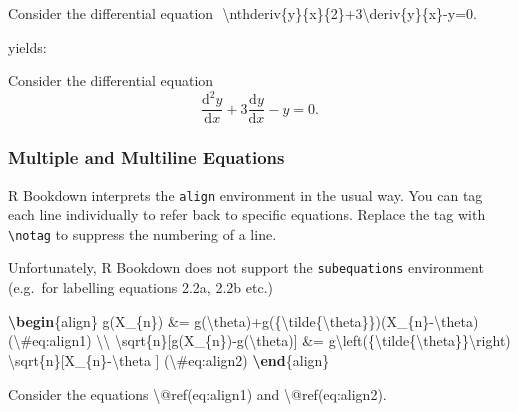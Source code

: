 \documentclass[
  letterpaper,
  oneside]{book}
\newenvironment{Shaded}{\begin{snugshade}}{\end{snugshade}}
\newcommand{\ExtensionTok}[1]{\textcolor[rgb]{0.00,0.23,0.31}{#1}}
\newcommand{\FunctionTok}[1]{\textcolor[rgb]{0.28,0.35,0.67}{#1}}
\newcommand{\KeywordTok}[1]{\textcolor[rgb]{0.00,0.23,0.31}{\textbf{#1}}}
\newcommand{\NormalTok}[1]{\textcolor[rgb]{0.00,0.23,0.31}{#1}}
\newcommand{\SpecialCharTok}[1]{\textcolor[rgb]{0.37,0.37,0.37}{#1}}
\newcommand{\SpecialStringTok}[1]{\textcolor[rgb]{0.13,0.47,0.30}{#1}}
\numberwithin{equation}{section}
\numberwithin{figure}{section}
\theoremstyle{break}
\theoremstyle{plain}
\theoremstyle{remark}
\begin{document}
\begin{Shaded}
\begin{Highlighting}[]
\NormalTok{Consider the differential equation}
\NormalTok{$$}
\NormalTok{\textbackslash{}nthderiv\{y\}\{x\}\{2\}+3\textbackslash{}deriv\{y\}\{x\}{-}y=0.}
\NormalTok{$$}
\end{Highlighting}
\end{Shaded}

yields:

Consider the differential equation \[
\frac{\mathrm{d}^2 y}{\mathrm{d}x}+3\frac{\mathrm{d}y}{\mathrm{d}x}-y=0.
\]

\subsubsection*{Multiple and Multiline
Equations}\label{multiple-and-multiline-equations}

R Bookdown interprets the \texttt{align} environment in the usual way.
You can tag each line individually to refer back to specific equations.
Replace the tag with \texttt{\textbackslash{}notag} to suppress the
numbering of a line.

Unfortunately, R Bookdown does not support the \texttt{subequations}
environment (e.g.~for labelling equations 2.2a, 2.2b etc.)

\begin{Shaded}
\begin{Highlighting}[]
\KeywordTok{\textbackslash{}begin}\NormalTok{\{}\ExtensionTok{align}\NormalTok{\}}
\SpecialStringTok{g(X\_\{n\}) \&= g(}\SpecialCharTok{\textbackslash{}theta}\SpecialStringTok{)+g\textquotesingle{}(\{}\SpecialCharTok{\textbackslash{}tilde}\SpecialStringTok{\{}\SpecialCharTok{\textbackslash{}theta}\SpecialStringTok{\}\})(X\_\{n\}{-}}\SpecialCharTok{\textbackslash{}theta}\SpecialStringTok{) (}\SpecialCharTok{\textbackslash{}\#}\SpecialStringTok{eq:align1) }\SpecialCharTok{\textbackslash{}\textbackslash{}}
\SpecialCharTok{\textbackslash{}sqrt}\SpecialStringTok{\{n\}[g(X\_\{n\}){-}g(}\SpecialCharTok{\textbackslash{}theta}\SpecialStringTok{)] \&= g\textquotesingle{}}\SpecialCharTok{\textbackslash{}left}\SpecialStringTok{(\{}\SpecialCharTok{\textbackslash{}tilde}\SpecialStringTok{\{}\SpecialCharTok{\textbackslash{}theta}\SpecialStringTok{\}\}}\SpecialCharTok{\textbackslash{}right}\SpecialStringTok{)}
\SpecialStringTok{  }\SpecialCharTok{\textbackslash{}sqrt}\SpecialStringTok{\{n\}[X\_\{n\}{-}}\SpecialCharTok{\textbackslash{}theta}\SpecialStringTok{ ] }
\SpecialStringTok{(}\SpecialCharTok{\textbackslash{}\#}\SpecialStringTok{eq:align2)}
\KeywordTok{\textbackslash{}end}\NormalTok{\{}\ExtensionTok{align}\NormalTok{\}}
  
\NormalTok{Consider the equations }\FunctionTok{\textbackslash{}@ref}\NormalTok{(eq:align1) and }\FunctionTok{\textbackslash{}@ref}\NormalTok{(eq:align2).}
\end{Highlighting}
\end{Shaded}
\end{document}
